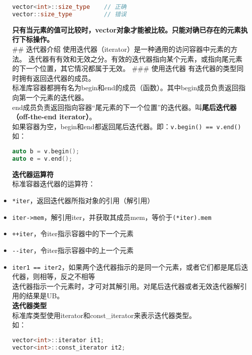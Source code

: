 \documentclass[
  a4paper,
  oneside,tablecaptionabove
]{scrbook}
\begin{document}
\begin{itemize}
\begin{lstlisting}[language={C++}]
vector<int>::size_type    // 正确
vector::size_type         // 错误
\end{lstlisting}

  \textbf{只有当元素的值可比较时，vector对象才能被比较。只能对确已存在的元素执行下标操作。}\\
  \#\# 迭代器介绍
  使用迭代器（iterator）是一种通用的访问容器中元素的方法。
  迭代器有有效和无效之分。有效的迭代器指向某个元素，或指向尾元素的下一个位置，其它情况都属于无效。
  \#\#\# 使用迭代器 有迭代器的类型同时拥有返回迭代器的成员。\\
  标准库容器都拥有名为begin和end的成员（函数）。其中begin成员负责返回指向第一个元素的迭代器。\\
  end成员负责返回指向容器\enquote{尾元素的下一个位置}的迭代器。叫\textbf{尾后迭代器（off-the-end
  iterator）}。\\
  如果容器为空，begin和end都返回尾后迭代器。即：\lstinline!v.begin() == v.end()!\\
  如：

\begin{lstlisting}[language={C++}]
auto b = v.begin();
auto e = v.end();
\end{lstlisting}

  \textbf{迭代器运算符}\\
  标准容器迭代器的运算符：\\
\item
  \lstinline!*iter!，返回迭代器所指对象的引用（解引用）\\
\item
  \lstinline!iter->mem!，解引用iter，并获取其成员mem，等价于\lstinline!(*iter).mem!\\
\item
  \lstinline!++iter!，令iter指示容器中的下一个元素\\
\item
  \lstinline!--iter!，令iter指示容器中的上一个元素\\
\item
  \lstinline!iter1 == iter2!，如果两个迭代器指示的是同一个元素，或者它们都是尾后迭代器，则相等，反之不相等\\
  迭代器指示一个元素时，才可对其解引用。对尾后迭代器或者无效迭代器解引用的结果是UB。\\
  \textbf{迭代器类型}\\
  标准库类型使用iterator和const\_iterator来表示迭代器类型。\\
  如：

\begin{lstlisting}[language={C++}]
vector<int>::iterator it1;
vector<int>::const_iterator it2;
\end{lstlisting}


\end{itemize}
\end{document}
